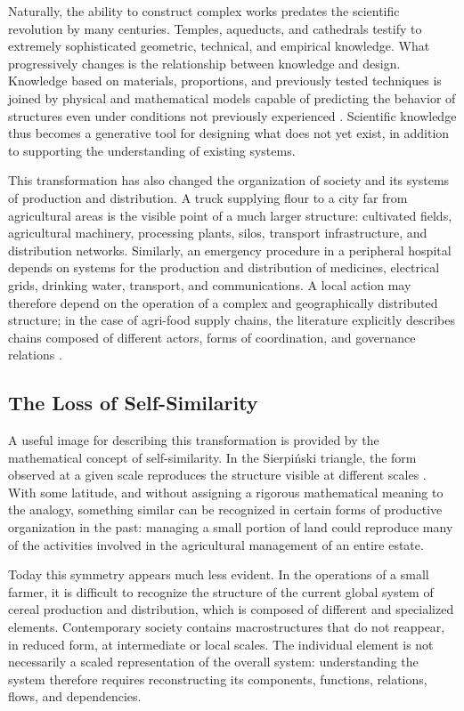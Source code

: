 \documentclass[11pt,a4paper]{article}
\begin{document}
Naturally, the ability to construct complex works predates the scientific revolution by many centuries. Temples, aqueducts, and cathedrals testify to extremely sophisticated geometric, technical, and empirical knowledge. What progressively changes is the relationship between knowledge and design. Knowledge based on materials, proportions, and previously tested techniques is joined by physical and mathematical models capable of predicting the behavior of structures even under conditions not previously experienced \cite{quarteroni2009,eckert2022}. Scientific knowledge thus becomes a generative tool for designing what does not yet exist, in addition to supporting the understanding of existing systems.

This transformation has also changed the organization of society and its systems of production and distribution. A truck supplying flour to a city far from agricultural areas is the visible point of a much larger structure: cultivated fields, agricultural machinery, processing plants, silos, transport infrastructure, and distribution networks. Similarly, an emergency procedure in a peripheral hospital depends on systems for the production and distribution of medicines, electrical grids, drinking water, transport, and communications. A local action may therefore depend on the operation of a complex and geographically distributed structure; in the case of agri-food supply chains, the literature explicitly describes chains composed of different actors, forms of coordination, and governance relations \cite{carbone2017}.

\subsection{The Loss of Self-Similarity}
A useful image for describing this transformation is provided by the mathematical concept of self-similarity. In the Sierpiński triangle, the form observed at a given scale reproduces the structure visible at different scales \cite{palagallo2004}. With some latitude, and without assigning a rigorous mathematical meaning to the analogy, something similar can be recognized in certain forms of productive organization in the past: managing a small portion of land could reproduce many of the activities involved in the agricultural management of an entire estate.

Today this symmetry appears much less evident. In the operations of a small farmer, it is difficult to recognize the structure of the current global system of cereal production and distribution, which is composed of different and specialized elements. Contemporary society contains macrostructures that do not reappear, in reduced form, at intermediate or local scales. The individual element is not necessarily a scaled representation of the overall system: understanding the system therefore requires reconstructing its components, functions, relations, flows, and dependencies.
\end{document}
